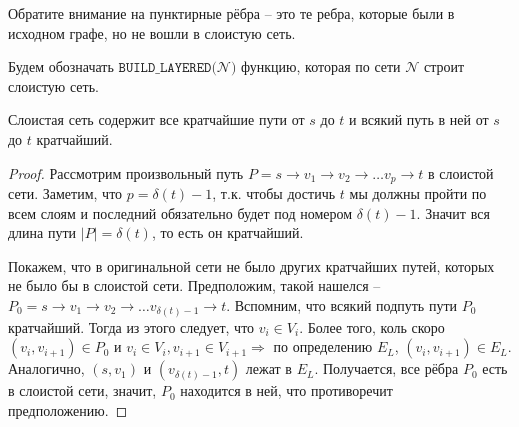 \begin{figure}[h]
{
    }
\end{figure}
Обратите внимание на пунктирные рёбра -- это те ребра, которые были в исходном графе, но не вошли в слоистую сеть.

Будем обозначать $\texttt{BUILD\_LAYERED(}\mathcal{N}\texttt{)}$ функцию, которая по сети $\mathcal{N}$ строит слоистую сеть.

 Слоистая сеть содержит все кратчайшие пути от $s$ до $t$ и всякий путь в ней от $s$ до $t$ кратчайший.
\begin{proof}
    
    Рассмотрим произвольный путь $P = s \to v_1 \to v_2 \to \dots v_p \to t$ в слоистой сети. Заметим, что $p = \delta(t) - 1$, т.к. чтобы достичь $t$ мы должны пройти по всем слоям и последний обязательно будет под номером $\delta(t) - 1$.
    Значит вся длина пути $|P| = \delta(t)$, то есть он кратчайший.

    Покажем, что в оригинальной сети не было других кратчайших путей, которых не было бы в слоистой сети. Предположим, такой нашелся -- $P_0 = s \to v_1 \to v_2 \to \dots v_{\delta(t) - 1} \to t$.
    Вспомним, что всякий подпуть пути $P_0$ кратчайший. Тогда из этого следует, что $v_i \in V_i$.
    Более того, коль скоро $(v_i, v_{i + 1}) \in P_0$ и $v_i \in V_i, v_{i + 1} \in V_{i + 1} \Rightarrow$ по определению $E_L$, $(v_{i}, v_{i + 1}) \in E_L$. Аналогично, $(s, v_1)$ и $(v_{\delta(t) - 1}, t)$ лежат в $E_L$.
    Получается, все рёбра $P_0$ есть в слоистой сети, значит, $P_0$ находится в ней, что противоречит предположению.

\end{proof}

